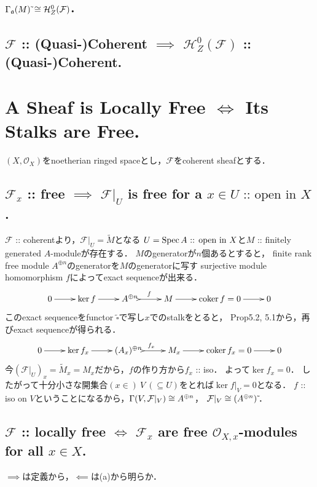 \documentclass[a4paper]{jsarticle}
\newcommand{\shF}{\mathcal{F}}
\newcommand{\shO}{\mathcal{O}}
\newcommand{\OpenIn}{\text{ :: open in }}
\newcommand{\sidetilde}{\,\tilde{}}
\begin{document}
    \subsection{$\Gamma_{\I{a}}(M)\sidetilde \iso \mathcal{H}_Z^0(\shF)$.}

    \subsection{$\shF$ :: (Quasi-)Coherent $\implies$ $\mathcal{H}_Z^0(\shF)$ :: (Quasi-)Coherent.}

\section{A Sheaf is Locally Free $\iff$ Its Stalks are Free.} %
    $(X,\shO_X)$をnoetherian ringed spaceとし，$\shF$をcoherent sheafとする．

    \subsection{$\shF_x$ :: free $\implies$ $\shF|_U$ is free for a $x \in U \OpenIn X$.}
    $\shF$ :: coherentより，$\shF|_U=\tilde{M}$となる
    $U=\Spec A \OpenIn X$と$M$ :: finitely generated $A$-moduleが存在する．
    $M$のgeneratorが$n$個あるとすると，
    finite rank free module $A^{\oplus n}$のgeneratorを$M$のgeneratorに写す
    surjective module homomorphism $f$によってexact sequenceが出来る．
    \[
        \xymatrix
        {
            0 \ar[r]& \ker f \ar[r]& A^{\oplus n} \ar@{>->}[r]^{f}& M \ar[r]& \coker f=0 \ar[r]& 0
        }
    \]
    このexact sequenceをfunctor $\tilde{\square}$で写し$x$でのstalkをとると，
    Prop5.2, 5.1から，再びexact sequenceが得られる．
    \[
        \xymatrix
        {
            0 \ar[r]& \ker f_x \ar[r]& (A_x)^{\oplus n} \ar@{>->}[r]^{f_x}& M_x \ar[r]& \coker f_x=0 \ar[r]& 0
        }
    \]
    今$(\shF|_U)_x=\tilde{M}_x=M_x$だから，$f$の作り方から$f_x$ :: iso．
    よって$\ker f_x=0$．
    したがって十分小さな開集合$(x \in)~ V ~(\subseteq U)$をとれば$\ker f|_V=0$となる．
    $f$ :: iso on $V$ということになるから，$\Gamma(V,\shF|_V) \iso A^{\oplus n}$，
    $\shF|_V \iso (A^{\oplus n})\sidetilde$．

    \subsection{$\shF$ :: locally free $\iff$ $\shF_x$ are free $\shO_{X,x}$-modules for all $x \in X$.}
    $\implies$は定義から，$\impliedby$は(a)から明らか．
\end{document}
